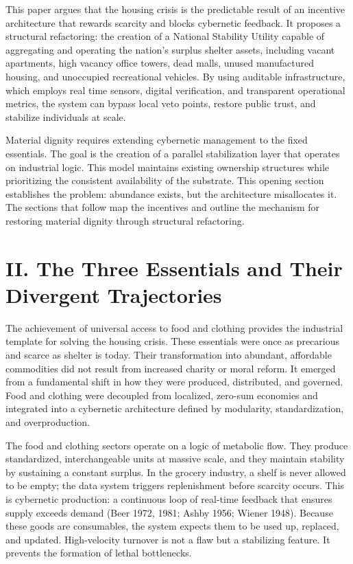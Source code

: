 \documentclass[
  12pt,
]{article}
\begin{document}
This paper argues that the housing crisis is the predictable result of an incentive architecture that rewards scarcity and blocks cybernetic feedback. It proposes a structural refactoring: the creation of a National Stability Utility capable of aggregating and operating the nation's surplus shelter assets, including vacant apartments, high vacancy office towers, dead malls, unused manufactured housing, and unoccupied recreational vehicles. By using auditable infrastructure, which employs real time sensors, digital verification, and transparent operational metrics, the system can bypass local veto points, restore public trust, and stabilize individuals at scale.

Material dignity requires extending cybernetic management to the fixed essentials. The goal is the creation of a parallel stabilization layer that operates on industrial logic. This model maintains existing ownership structures while prioritizing the consistent availability of the substrate. This opening section establishes the problem: abundance exists, but the architecture misallocates it. The sections that follow map the incentives and outline the mechanism for restoring material dignity through structural refactoring.

\hypertarget{ii.-the-three-essentials-and-their-divergent-trajectories}{%
\section{II. The Three Essentials and Their Divergent Trajectories}\label{ii.-the-three-essentials-and-their-divergent-trajectories}}

The achievement of universal access to food and clothing provides the industrial template for solving the housing crisis. These essentials were once as precarious and scarce as shelter is today. Their transformation into abundant, affordable commodities did not result from increased charity or moral reform. It emerged from a fundamental shift in how they were produced, distributed, and governed. Food and clothing were decoupled from localized, zero-sum economies and integrated into a cybernetic architecture defined by modularity, standardization, and overproduction.

The food and clothing sectors operate on a logic of metabolic flow. They produce standardized, interchangeable units at massive scale, and they maintain stability by sustaining a constant surplus. In the grocery industry, a shelf is never allowed to be empty; the data system triggers replenishment before scarcity occurs. This is cybernetic production: a continuous loop of real-time feedback that ensures supply exceeds demand (Beer 1972, 1981; Ashby 1956; Wiener 1948). Because these goods are consumables, the system expects them to be used up, replaced, and updated. High-velocity turnover is not a flaw but a stabilizing feature. It prevents the formation of lethal bottlenecks.
\end{document}
